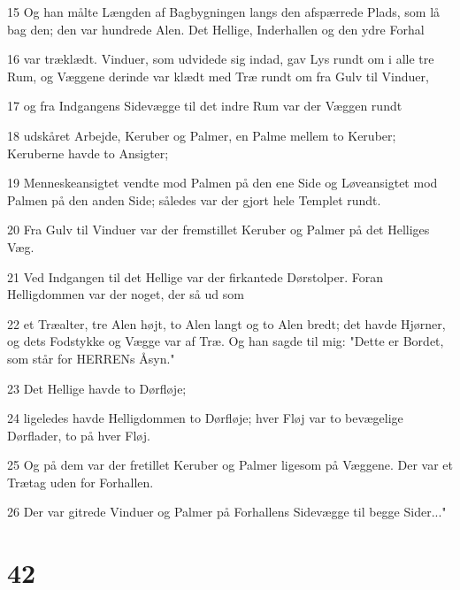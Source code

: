 \par 15 Og han målte Længden af Bagbygningen langs den afspærrede Plads, som lå bag den; den var hundrede Alen. Det Hellige, Inderhallen og den ydre Forhal
\par 16 var træklædt. Vinduer, som udvidede sig indad, gav Lys rundt om i alle tre Rum, og Væggene derinde var klædt med Træ rundt om fra Gulv til Vinduer,
\par 17 og fra Indgangens Sidevægge til det indre Rum var der Væggen rundt
\par 18 udskåret Arbejde, Keruber og Palmer, en Palme mellem to Keruber; Keruberne havde to Ansigter;
\par 19 Menneskeansigtet vendte mod Palmen på den ene Side og Løveansigtet mod Palmen på den anden Side; således var der gjort hele Templet rundt.
\par 20 Fra Gulv til Vinduer var der fremstillet Keruber og Palmer på det Helliges Væg.
\par 21 Ved Indgangen til det Hellige var der firkantede Dørstolper. Foran Helligdommen var der noget, der så ud som
\par 22 et Træalter, tre Alen højt, to Alen langt og to Alen bredt; det havde Hjørner, og dets Fodstykke og Vægge var af Træ. Og han sagde til mig: "Dette er Bordet, som står for HERRENs Åsyn."
\par 23 Det Hellige havde to Dørfløje;
\par 24 ligeledes havde Helligdommen to Dørfløje; hver Fløj var to bevægelige Dørflader, to på hver Fløj.
\par 25 Og på dem var der fretillet Keruber og Palmer ligesom på Væggene. Der var et Trætag uden for Forhallen.
\par 26 Der var gitrede Vinduer og Palmer på Forhallens Sidevægge til begge Sider..."

\chapter{42}

